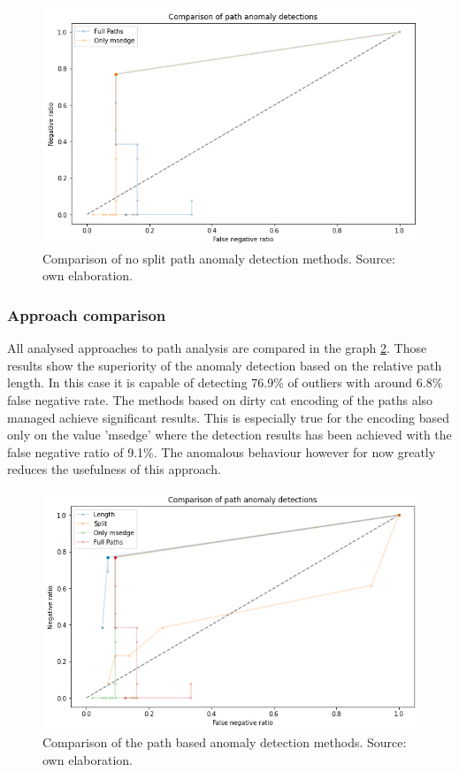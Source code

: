 \documentclass[a4paper,twoside,12pt]{book}
\begin{document}
\begin{figure}
	\centering
	\includegraphics[scale=0.9]{images/OcsvmNoSplitComp}
	\caption{Comparison of no split path anomaly detection methods. Source: own elaboration.}
	\label{fig:ocsvmNoSplitComp}
 \end{figure}
 
\subsubsection{Approach comparison}

All analysed approaches to path analysis are compared in the graph \ref{fig:pathcomp}. Those results show the
superiority of the anomaly detection based on the relative path length. In this case it is capable of detecting 
76.9\% of outliers with around 6.8\% false negative rate. The methods based on dirty cat encoding of the paths also managed 
achieve significant results. This is especially true for the encoding based only on the value 'msedge' where 
the detection results has been achieved with the false negative ratio of 9.1\%. The anomalous behaviour however for now
greatly reduces the usefulness of this approach.

\begin{figure}
	\centering
	\includegraphics[scale=0.9]{images/PathCompGraph2}
	\caption{Comparison of the path based anomaly detection methods. Source: own elaboration.}
	\label{fig:pathcomp}
 \end{figure}
\end{document}
